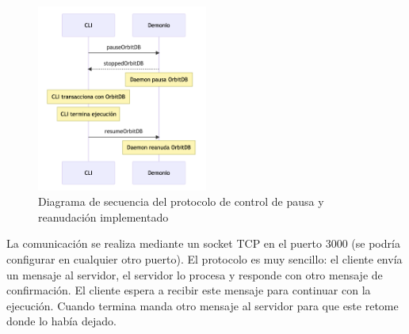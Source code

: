 \begin{figure}[H]
  \centering
  \includegraphics[width=0.5\textwidth]{images/control_pausa_reanudacion.png}
  \caption{Diagrama de secuencia del protocolo de control de pausa y reanudación implementado}
  \label{fig:control_pausa_reanudacion}
\end{figure}

La comunicación se realiza mediante un socket TCP en el puerto 3000 (se podría configurar en cualquier otro puerto). El protocolo es muy sencillo: el cliente envía un mensaje al servidor, el servidor lo procesa y responde con otro mensaje de confirmación. El cliente espera a recibir este mensaje para continuar con la ejecución. Cuando termina manda otro mensaje al servidor para que este retome donde lo había dejado.

